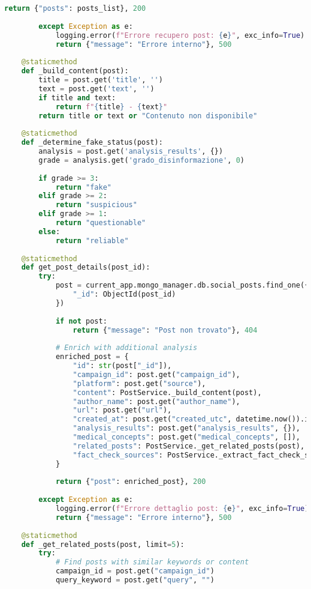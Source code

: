 \documentclass[12pt,a4paper]{report}
\begin{document}
\begin{lstlisting}[language=Python, caption=Post Service]
            return {"posts": posts_list}, 200
            
        except Exception as e:
            logging.error(f"Errore recupero post: {e}", exc_info=True)
            return {"message": "Errore interno"}, 500
    
    @staticmethod
    def _build_content(post):
        title = post.get('title', '')
        text = post.get('text', '')
        if title and text:
            return f"{title} - {text}"
        return title or text or "Contenuto non disponibile"
    
    @staticmethod
    def _determine_fake_status(post):
        analysis = post.get('analysis_results', {})
        grade = analysis.get('grado_disinformazione', 0)
        
        if grade >= 3:
            return "fake"
        elif grade >= 2:
            return "suspicious"
        elif grade >= 1:
            return "questionable"
        else:
            return "reliable"
    
    @staticmethod
    def get_post_details(post_id):
        try:
            post = current_app.mongo_manager.db.social_posts.find_one({
                "_id": ObjectId(post_id)
            })
            
            if not post:
                return {"message": "Post non trovato"}, 404
            
            # Enrich with additional analysis
            enriched_post = {
                "id": str(post["_id"]),
                "campaign_id": post.get("campaign_id"),
                "platform": post.get("source"),
                "content": PostService._build_content(post),
                "author_name": post.get("author_name"),
                "url": post.get("url"),
                "created_at": post.get("created_utc", datetime.now()).isoformat(),
                "analysis_results": post.get("analysis_results", {}),
                "medical_concepts": post.get("medical_concepts", []),
                "related_posts": PostService._get_related_posts(post),
                "fact_check_sources": PostService._extract_fact_check_sources(post)
            }
            
            return {"post": enriched_post}, 200
            
        except Exception as e:
            logging.error(f"Errore dettaglio post: {e}", exc_info=True)
            return {"message": "Errore interno"}, 500
    
    @staticmethod
    def _get_related_posts(post, limit=5):
        try:
            # Find posts with similar keywords or content
            campaign_id = post.get("campaign_id")
            query_keyword = post.get("query", "")
            

\end{lstlisting}
\end{document}
